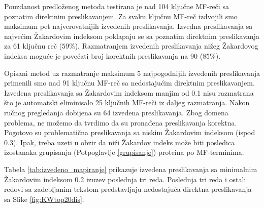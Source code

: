 Pouzdanost predloženog metoda testirana je nad 104 ključne MF-reči  sa poznatim
direktnim preslikavanjem.  Za svaku ključnu MF-reč izdvojili smo maksimum pet
najverovatnijih izvedenih preslikavanja. Izvedna preslikavanja sa najvećim Žakardovim
indeksom poklapaju se sa poznatim direktnim preslikavanja za 61 ključnu reč
($59\%$). Razmatranjem izvedenih preslikavanja nižeg Žakardovog indeksa moguće
je povećati broj korektnih preslikavanja na 90 ($85\%$).

Opisani metod uz razmatranje maksimum 5 najpogodnijih izvedenih preslikavanja
primenili smo nad 91 ključnu MF-reč  sa nedostajućim direktnim preslikavanjem.
Izvedena preslikavanja sa Žakardovim indeksom manjim od 0.1 nisu razmatrana što
je automatski eliminisalo 25 ključnih MF-reči  iz daljeg razmatranja. Nakon
ručnog pregledanja dobijena su 64 izvedena preslikavanja. Zbog domena problema,
ne možemo da tvrdimo da su pronađena preslikavanja korektna. Pogotovo su
problematična preslikavanja sa niskim Žakardovim indeksom (ispod 0.3). Ipak,
treba uzeti u obzir da niži Žakardov indeks može biti posledica izostanaka
grupisanja (Potpoglavlje \ref{grupisanje}) proteina po MF-terminima.

Tabela \ref{tab:izvedeno_mapiranje} prikazuje izvedena preslikavanja sa
minimalnim Žakardovim indeksom 0.2 izuzev poslednja tri reda. Poslednja tri
reda i ostali redovi sa zadebljanim tekstom  predstavljaju
nedostajuća direktna preslikavanja sa Slike \ref{fig:KWtop20dis}.



